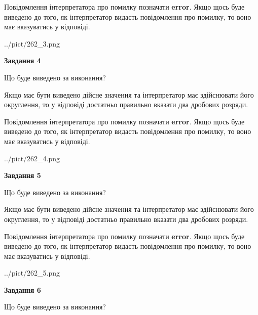 \documentclass[12pt, ukrainian]{article}
\begin{document}
{\begin {Large}
Повідомлення інтерпретатора про помилку позначати \textbf{error}.
Якщо щось буде виведено до того, як інтерпретатор видасть повідомлення про помилку, 
то воно має вказуватись у відповіді. \par

\begin{center}
	{../pict/262_3.png}
\end{center}
\newpage

{\begin {center}\textbf{Завдання 4}\end {center}}\par
Що буде виведено за виконання? \par

Якщо має бути виведено дійсне значення та інтерпретатор має здійснювати його округлення, 
то у відповіді достатньо правильно вказати два дробових розряди.

Повідомлення інтерпретатора про помилку позначати \textbf{error}.
Якщо щось буде виведено до того, як інтерпретатор видасть повідомлення про помилку, 
то воно має вказуватись у відповіді. \par

\begin{center}
	{../pict/262_4.png}
\end{center}
\newpage

{\begin {center}\textbf{Завдання 5}\end {center}}\par
Що буде виведено за виконання? \par

Якщо має бути виведено дійсне значення та інтерпретатор має здійснювати його округлення, 
то у відповіді достатньо правильно вказати два дробових розряди.

Повідомлення інтерпретатора про помилку позначати \textbf{error}.
Якщо щось буде виведено до того, як інтерпретатор видасть повідомлення про помилку, 
то воно має вказуватись у відповіді. \par

\begin{center}
	{../pict/262_5.png}
\end{center}
\newpage

{\begin {center}\textbf{Завдання 6}\end {center}}\par
Що буде виведено за виконання? \par


\end{Large}}
\end{document}
